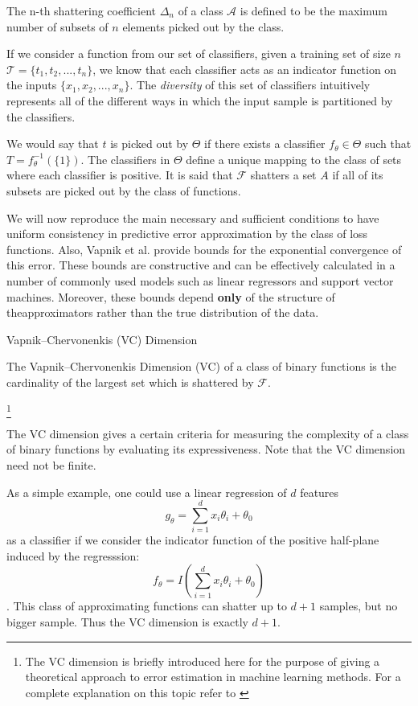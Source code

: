 The n-th shattering coefficient $\Delta_n$ of a class $\mathcal {A}$ is defined to be the maximum number of subsets of $n$ elements picked out by the class. 

If we consider a function from our set of classifiers, given a training set of size $n$
$\mathcal {T} = \{ t_1,t_2,...,t_n  \}$, we know that each classifier acts as an indicator function on the inputs $\{ x_1,x_2,...,x_n  \}$. The \textit{diversity} of this set of classifiers intuitively represents all of the different ways in which the input sample is partitioned by the classifiers. 

We would say that $t$ is picked out by $\Theta$ if there exists a classifier $f_{\theta} \in \Theta$ such that $T = f_{\theta}^{-1}(\{1\})$. The classifiers in $\Theta$ define a unique mapping to the class of sets where each classifier is positive. It is said that $\mathcal {F}$ shatters a set $A$ if all of its subsets are picked out by the class of functions.

We will now reproduce the main necessary and sufficient conditions to have uniform consistency in predictive error approximation by the class of loss functions. Also,
Vapnik et al. provide bounds for the exponential convergence of this error. These bounds are constructive and can be effectively calculated in a number of commonly used models such as linear regressors and support vector machines. Moreover, these bounds depend \textbf{only} of the structure of theapproximators rather than the true distribution of the data. 


\begin{definition}{Vapnik–Chervonenkis (VC) Dimension}
	
	The Vapnik–Chervonenkis Dimension (VC) of a class of binary functions is the cardinality of the largest set which is shattered by $\mathcal {F}$.
\end{definition}\footnote{The VC dimension is briefly introduced here for the purpose of giving a theoretical approach to error estimation in machine learning methods. For a complete explanation on this topic refer to \cite{vapnik-nature2013}}

The VC dimension gives a certain criteria for measuring the complexity of a class of binary functions by evaluating its expressiveness. Note that the VC dimension need not be finite.

As a simple example, one could use a linear regression of $d$ features $$g_{\theta} = \sum_{i=1}^d x_i \theta_i + \theta_0$$ as a classifier if we consider the indicator function of the positive half-plane induced by the regresssion: $$f_{\theta} = I(\sum_{i=1}^d x_i \theta_i + \theta_0)$$. This class of approximating functions can shatter up to $d+1$ samples, but no bigger sample. Thus the VC dimension is exactly $d+1$. 

